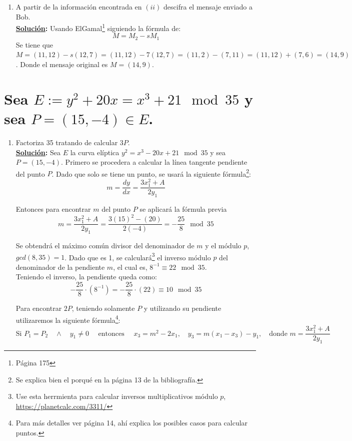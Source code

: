 \documentclass[11pt,letterpaper]{article}
\newcommand{\sol}{\textbf{\underline{Solución}: }} %
\begin{document}
\begin{enumerate}[label=(\roman*)]
    \item A partir de la información encontrada en $(ii)$ descifra el mensaje enviado a Bob.\\
    \sol Usando ElGamal\footnote{Página 175} siguiendo la fórmula de:
    $$M = M_2 - sM_1$$
    Se tiene que $M = (11,12) - s(12,7) = (11,12) - 7(12,7) = (11,2) - (7,11) = (11,12) + (7,6) = (14,9)$.
    Donde el mensaje original es $M = (14,9)$.

\end{enumerate}

\section{Sea $E := y^2 + 20x = x^3 +21 \mod{35}$ y sea $P = (15, -4) \in E$.}

\begin{enumerate}[label=(\roman*)]
    \item Factoriza 35 tratando de calcular $3P$.\\
    \sol Sea $E$ la curva elíptica $y^2 = x^3 - 20x + 21 \mod{35}$ y sea $P = (15, -4)$.
    Primero se procedera a calcular la línea tangente pendiente del punto $P$. Dado que solo se tiene
    un punto, se usará la siguiente fórmula\footnote{Se explica bien el porqué en la página 13 de
    la bibliografía.}:
    $$m = \frac{dy}{dx} = \frac{3x_1^2 + A}{2y_1}$$
    
    Entonces para encontrar $m$ del punto $P$ se aplicará la fórmula previa
    $$m = \frac{3x_1^2 + A}{2y_1} = \frac{3(15)^2 - (20)}{2(-4)} = -\frac{25}{8} \mod{35}$$
    
    Se obtendrá el máximo común divisor del denominador de $m$ y el módulo $p$,  $gcd(8, 35) = 1$. Dado que
    es 1, se calculará\footnote{Use esta herrmienta para calcular inversos multiplicativos módulo $p$,
    \url{https://planetcalc.com/3311/}}
    el inverso módulo $p$ del denominador de la pendiente $m$, el cual es, $8^{-1} \equiv 22 \mod 35$.\\
    Teniendo el inverso, la pendiente queda como:
    $$-\frac{25}{8} \cdot (8^{-1}) = -\frac{25}{8} \cdot (22) \equiv 10 \mod 35$$
    
    Para encontrar $2P$, teniendo solamente $P$ y utilizando su pendiente utilizaremos la siguiente
    fórmula\footnote{Para más detalles ver página 14, ahí explica los posibles casos para calcular puntos.}:
    $$\text{Si } P_1 = P_2 \quad \land \quad y_1 \neq 0 \quad \text{ entonces } \quad x_3 = m^2 - 2x_1,  \quad y_3 = m(x_1 - x_3)-y_1, \quad \text{donde } m= \frac{3x_1^2+A}{2y_1}$$
    

\end{enumerate}
\end{document}
